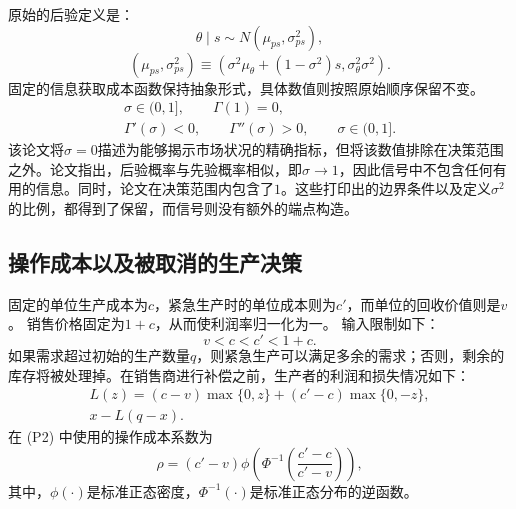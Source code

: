 \documentclass{article}
\begin{document}
原始的后验定义是：
\begin{equation}
\theta\mid s\sim N(\mu_{ps},\sigma_{ps}^2),
\tag{1}
\end{equation}
\begin{equation}
(\mu_{ps},\sigma_{ps}^2)
\equiv\left(\sigma^2\mu_\theta+(1-\sigma^2)s,
\sigma_\theta^2\sigma^2\right).
\tag{2}
\end{equation}
固定的信息获取成本函数保持抽象形式，具体数值则按照原始顺序保留不变。
\begin{gather*}
\sigma\in(0,1],\qquad \Gamma(1)=0,\\
\Gamma'(\sigma)<0,\qquad\Gamma''(\sigma)>0,
\qquad\sigma\in(0,1].
\end{gather*}
该论文将$\sigma=0$描述为能够揭示市场状况的精确指标，但将该数值排除在决策范围之外。论文指出，后验概率与先验概率相似，即$\sigma\to1$，因此信号中不包含任何有用的信息。同时，论文在决策范围内包含了$1$。这些打印出的边界条件以及定义$\sigma^2$的比例，都得到了保留，而信号则没有额外的端点构造。

\subsection*{操作成本以及被取消的生产决策}

固定的单位生产成本为$c$，紧急生产时的单位成本则为$c'$，而单位的回收价值则是$v$。 销售价格固定为$1+c$，从而使利润率归一化为一。 输入限制如下：
\begin{equation*}
v<c<c'<1+c.
\end{equation*}
如果需求超过初始的生产数量$q$，则紧急生产可以满足多余的需求；否则，剩余的库存将被处理掉。在销售商进行补偿之前，生产者的利润和损失情况如下：
\begin{gather*}
L(z)=(c-v)\max\{0,z\}+(c'-c)\max\{0,-z\},\\
x-L(q-x).
\end{gather*}
在 (P2) 中使用的操作成本系数为
\begin{equation*}
\rho=(c'-v)\phi\!\left(\Phi^{-1}\!\left(\frac{c'-c}{c'-v}\right)\right),
\end{equation*}
其中，$\phi(\cdot)$是标准正态密度，$\Phi^{-1}(\cdot)$是标准正态分布的逆函数。
\end{document}
